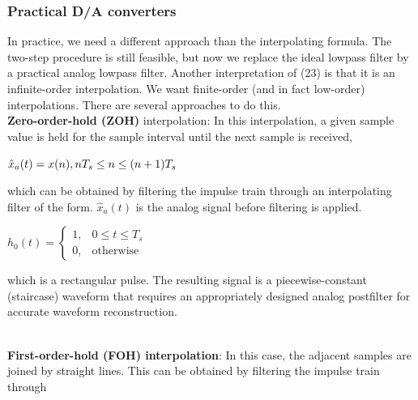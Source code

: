\documentclass{article}
\begin{document}
\subsubsection{Practical D/A converters}
In practice, we need a different approach
than the interpolating formula. The two-step procedure is still feasible, but now we replace
the ideal lowpass filter by a practical analog lowpass filter. Another interpretation of (23) is that it is an infinite-order interpolation. We want
finite-order (and in fact low-order) interpolations. There are several approaches to do this. \\
\vspace{1em}
\textbf{Zero-order-hold (ZOH)} interpolation: In this interpolation, a
given sample value is held for the sample interval until the next sample
is received,
\begin{center}
$\hat{x}_a(t)  = x(n), \space nT_s \leq n \leq (n+1)T_s$
\end{center}
which can be obtained by filtering the impulse train through an interpolating filter of the form. $\hat{x}_a(t)$ is the analog signal before filtering is applied. 
\begin{center}
    $h_0(t)= \begin{cases}
        1, & 0 \leq t \leq T_s \\
        0, & \text{otherwise}
    \end{cases}$
\end{center}
which is a rectangular pulse. The resulting signal is a piecewise-constant
(staircase) waveform that requires an appropriately designed analog
postfilter for accurate waveform reconstruction. \\
 \\
\vspace{1em}
\textbf{First-order-hold (FOH) interpolation}: In this case, the adjacent
samples are joined by straight lines. This can be obtained by filtering
the impulse train through \\
\end{document}
